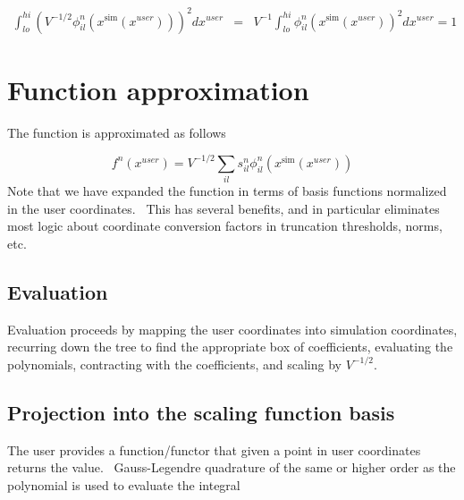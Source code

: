 \documentclass[letterpaper]{book}
\begin{document}
\begin{equation}
\begin{matrix}\int _{\mathrm{{\mathit{lo}}}}^{\mathrm{{\mathit{hi}}}}\left(V^{-1/2}\phi
_{il}^{n}(x^{\mathrm{{sim}}}(x^{\mathrm{{\mathit{user}}}}))\right)^{2}dx^{\mathrm{{\mathit{user}}}}&\text{=}&V^{-1}\int
_{\mathrm{{\mathit{lo}}}}^{\mathrm{{\mathit{hi}}}}\phi
_{il}^{n}(x^{\mathrm{{sim}}}(x^{\mathrm{{\mathit{user}}}}))^{2}dx^{\mathrm{{\mathit{user}}}}=1\end{matrix}
\end{equation}
\section{Function approximation}
The function is approximated as follows 

\begin{equation}\label{seq:refText19}
f^{n}(x^{\mathrm{{\mathit{user}}}})=V^{-1/2}\sum _{il}s_{il}^{n}\phi
_{il}^{n}(x^{\mathrm{{sim}}}(x^{\mathrm{{\mathit{user}}}}))
\end{equation}
Note that we have expanded the function in terms of basis functions normalized in the user coordinates. \ This has
several benefits, and in particular eliminates most logic about coordinate conversion factors in truncation thresholds,
norms, etc.

\subsection{Evaluation}
Evaluation proceeds by mapping the user coordinates into simulation coordinates, recurring down the tree to find the
appropriate box of coefficients, evaluating the polynomials, contracting with the coefficients, and scaling by 
$V^{-1/2}$.

\subsection{Projection into the scaling function basis}
The user provides a function/functor that given a point in user coordinates returns the value. \ Gauss-Legendre
quadrature of the same or higher order as the polynomial is used to evaluate the integral 
\end{document}
